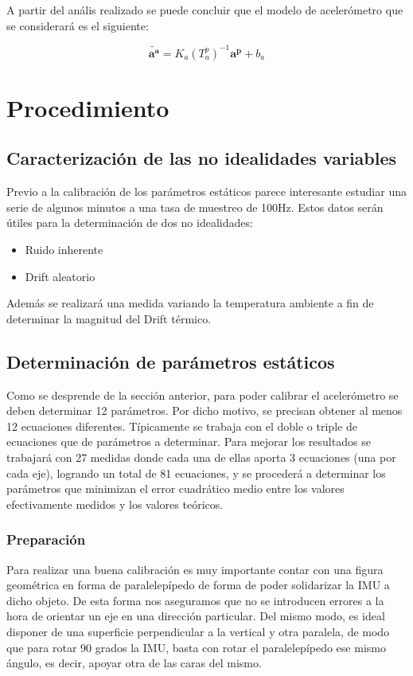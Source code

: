 \documentclass[main]{subfiles}
\begin{document}
A partir del anális realizado se puede concluir que el modelo de acelerómetro que se considerará es el siguiente:

$$\tilde{\mathbf{a^a}}=K_a(T_a^p)^{-1}\mathbf{a^p}+b_a$$

\section{Procedimiento}
\subsection{Caracterización de las no idealidades variables}

Previo a la calibración de los parámetros estáticos parece interesante estudiar una serie de algunos minutos a una tasa de muestreo de 100Hz. Estos datos serán útiles para la determinación de dos no idealidades:  
\begin{itemize}
\item Ruido inherente
\item Drift aleatorio
\end{itemize}

Además se realizará una medida variando la temperatura ambiente a fin de determinar la magnitud del Drift térmico.

\subsection{Determinación de parámetros estáticos}

Como se desprende de la sección anterior, para poder calibrar el acelerómetro se deben determinar 12 parámetros. Por dicho motivo, se precisan obtener al menos 12 ecuaciones diferentes. Típicamente se trabaja con el doble o triple de ecuaciones que de parámetros a determinar. Para mejorar los resultados se trabajará con 27 medidas donde cada una de ellas aporta 3 ecuaciones (una por cada eje), logrando un total de 81 ecuaciones, y se procederá a determinar los parámetros que minimizan el error cuadrático medio entre los valores efectivamente medidos y los valores teóricos. 

\subsubsection*{Preparación}
Para realizar una buena calibración es muy importante contar con una figura geométrica en forma de paralelepípedo de forma de poder solidarizar la IMU a dicho objeto. De esta forma nos aseguramos que no se introducen errores a la hora de orientar un eje en una dirección particular. Del mismo modo, es ideal disponer de una superficie perpendicular a la vertical y otra paralela, de modo que para rotar 90 grados la IMU, basta con rotar el paralelepípedo ese mismo ángulo, es decir, apoyar otra de las caras del mismo. \\
\end{document}
